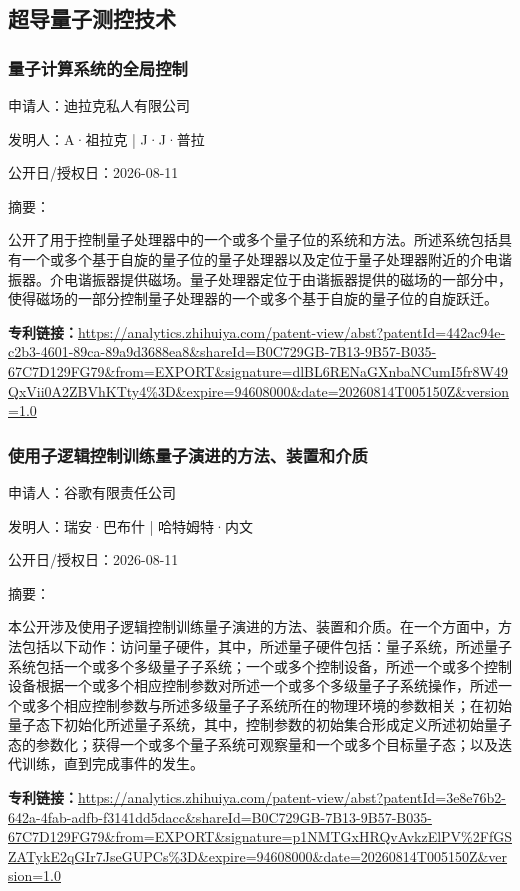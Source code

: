 \documentclass[12pt,a4paper]{ctexart}
\begin{document}
\subsection{ 超导量子测控技术 }

\subsubsection{ 量子计算系统的全局控制 }

申请人：迪拉克私人有限公司

发明人：A·祖拉克 | J·J·普拉

公开日/授权日：2026-08-11

摘要：

公开了用于控制量子处理器中的一个或多个量子位的系统和方法。所述系统包括具有一个或多个基于自旋的量子位的量子处理器以及定位于量子处理器附近的介电谐振器。介电谐振器提供磁场。量子处理器定位于由谐振器提供的磁场的一部分中，使得磁场的一部分控制量子处理器的一个或多个基于自旋的量子位的自旋跃迁。

\noindent\textbf{专利链接：}\url{https://analytics.zhihuiya.com/patent-view/abst?patentId=442ac94e-c2b3-4601-89ca-89a9d3688ea8&shareId=B0C729GB-7B13-9B57-B035-67C7D129FG79&from=EXPORT&signature=dlBL6RENaGXnbaNCumI5fr8W49QxVii0A2ZBVhKTty4%3D&expire=94608000&date=20260814T005150Z&version=1.0}

\subsubsection{ 使用子逻辑控制训练量子演进的方法、装置和介质 }

申请人：谷歌有限责任公司

发明人：瑞安·巴布什 | 哈特姆特·内文

公开日/授权日：2026-08-11

摘要：

本公开涉及使用子逻辑控制训练量子演进的方法、装置和介质。在一个方面中，方法包括以下动作：访问量子硬件，其中，所述量子硬件包括：量子系统，所述量子系统包括一个或多个多级量子子系统；一个或多个控制设备，所述一个或多个控制设备根据一个或多个相应控制参数对所述一个或多个多级量子子系统操作，所述一个或多个相应控制参数与所述多级量子子系统所在的物理环境的参数相关；在初始量子态下初始化所述量子系统，其中，控制参数的初始集合形成定义所述初始量子态的参数化；获得一个或多个量子系统可观察量和一个或多个目标量子态；以及迭代训练，直到完成事件的发生。

\noindent\textbf{专利链接：}\url{https://analytics.zhihuiya.com/patent-view/abst?patentId=3e8e76b2-642a-4fab-adfb-f3141dd5dacc&shareId=B0C729GB-7B13-9B57-B035-67C7D129FG79&from=EXPORT&signature=p1NMTGxHRQvAvkzElPV%2FfGSZATykE2qGIr7JseGUPCs%3D&expire=94608000&date=20260814T005150Z&version=1.0}
\end{document}
